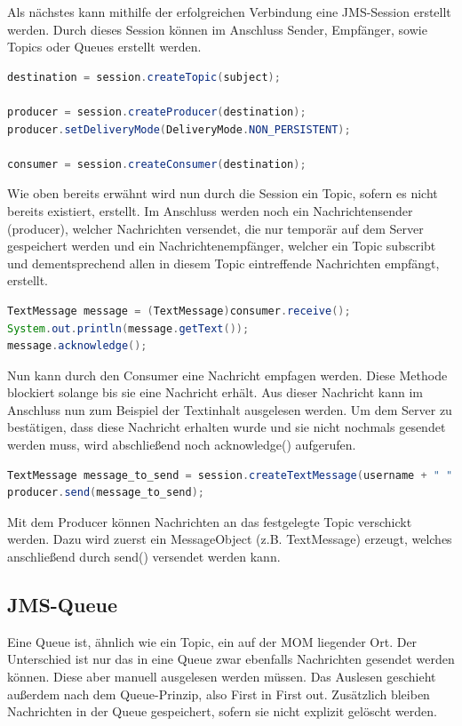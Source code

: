 \documentclass[11pt, a4paper]{article}
\begin{document}
Als nächstes kann mithilfe der erfolgreichen Verbindung eine JMS-Session erstellt werden. Durch dieses Session können im Anschluss Sender, Empfänger, sowie
Topics oder Queues erstellt werden.

\begin{lstlisting}[language=Java]
destination = session.createTopic(subject);

producer = session.createProducer(destination);
producer.setDeliveryMode(DeliveryMode.NON_PERSISTENT);
		
consumer = session.createConsumer(destination);
\end{lstlisting}

Wie oben bereits erwähnt wird nun durch die Session ein Topic, sofern es nicht bereits existiert, erstellt.
Im Anschluss werden noch ein Nachrichtensender (producer), welcher Nachrichten versendet, die nur temporär auf dem Server gespeichert werden und ein Nachrichtenempfänger,
welcher ein Topic subscribt und dementsprechend allen in diesem Topic eintreffende Nachrichten empfängt, erstellt.

\begin{lstlisting}[language=Java]
TextMessage message = (TextMessage)consumer.receive();
System.out.println(message.getText());
message.acknowledge();
\end{lstlisting}

Nun kann durch den Consumer eine Nachricht empfagen werden. Diese Methode blockiert solange bis sie eine Nachricht erhält. Aus dieser Nachricht kann im
Anschluss nun zum Beispiel der Textinhalt ausgelesen werden. Um dem Server zu bestätigen, dass diese Nachricht erhalten wurde und sie nicht nochmals gesendet
werden muss, wird abschließend noch acknowledge() aufgerufen.

\begin{lstlisting}[language=Java]
TextMessage message_to_send = session.createTextMessage(username + " " +  ip + ": " + message);
producer.send(message_to_send);
\end{lstlisting}

Mit dem Producer können Nachrichten an das festgelegte Topic verschickt werden. Dazu wird zuerst ein MessageObject (z.B. TextMessage) erzeugt, welches
anschließend durch send() versendet werden kann.

\subsection{JMS-Queue}
Eine Queue ist, ähnlich wie ein Topic, ein auf der MOM liegender Ort. Der Unterschied ist nur das in eine Queue zwar ebenfalls Nachrichten gesendet werden
können. Diese aber manuell ausgelesen werden müssen. Das Auslesen geschieht außerdem nach dem Queue-Prinzip, also First in First out. Zusätzlich bleiben
Nachrichten in der Queue gespeichert, sofern sie nicht explizit gelöscht werden.
\end{document}
